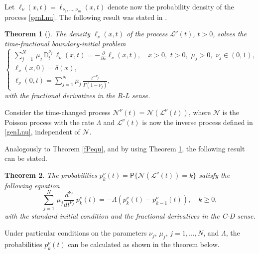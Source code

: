 \documentclass[12pt]{article}
\theoremstyle{definition}
\theoremstyle{plain}
\newtheorem{theorem}{Theorem}
\newcommand{\Prob}{\mathsf{P}}
\begin{document}
	
	 Let $\ell_\nu(x,t)=\ell_{\nu_1,\ldots,\nu_m}(x,t)$ denote now the probability density of the process \eqref{genLnu}. The following result was stated in \cite{OT2017}.
	
	
\begin{theorem}[\cite{OT2017}]\label{geninvequ}	
	{The density $\ell_\nu(x,t)$ of the process $\mathcal{L}^\nu(t)$, $t > 0$, solves the time-fractional boundary-initial problem}
	\begin{equation}\label{genLdensity}
		\begin{cases}
			\sum_{j=1}^N \,\mu_j\,\mathbb{D}_t^{\nu_j} \, \ell_\nu(x,t) = -\frac{\partial}{\partial x} \ell_\nu(x,t), \quad x > 0,\,\, t > 0,\,\, \mu_j>0,\,\,\nu_j \in (0,1), \\
			\ell_\nu(x,0) = \delta(x), \\
			\ell_\nu(0,t) = \sum_{j=1}^N \mu_j\,\frac{t^{-\nu_j}}{\Gamma(1-\nu_j)} ,
		\end{cases}
	\end{equation}
	with the fractional derivatives in the R-L sense.
\end{theorem}

Consider the time-changed process ${\mathcal N}^\nu(t)={\mathcal N}(\mathcal{L}^\nu(t))$, where $\mathcal N$ is the Poisson process with the rate $\Lambda$ and $\mathcal{L}^\nu(t)$ is now the inverse process defined in \eqref{genLnu}, independent of $\mathcal N$.

Analogously to Theorem \ref{fPequ}, and by using Theorem \ref{geninvequ}, the following result can be stated.

\begin{theorem}\label{genfPequ} The probabilities ${p}^\nu_k(t)=\Prob\{\mathcal N(\mathcal{L}^\nu(t))=k\}$
satisfy the following  equation
\begin{equation}\label{gen(3.1)-(3.2)}
	\sum_{j=1}^N \,\mu_j \frac{d^{\nu_j} }{dt^{\nu_j}}\, p_k^\nu(t) = -\Lambda\left(p_k^\nu(t) - p_{k-1}^\nu(t)\right), \quad k \ge 0,
\end{equation}
with the standard initial condition and the  fractional derivatives in the C-D sense.
\end{theorem}

Under  particular conditions on the parameters $\nu_j$, $\mu_j$, $j=1,\ldots, N$, and $\Lambda$, the probabilities $p_k^\nu(t)$ can be calculated as shown in  the theorem below.
\end{document}
